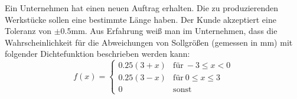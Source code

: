 \documentclass{abgabe}
\begin{document}
\begin{questions}
    \question
    Ein Unternehmen hat einen neuen Auftrag erhalten.
    Die zu produzierenden Werkstücke sollen eine bestimmte Länge haben.
    Der Kunde akzeptiert eine Toleranz von $\pm 0.5\si{\mm}$.
    Aus Erfahrung weiß man im Unternehmen, dass die Wahrscheinlichkeit für die Abweichungen von Sollgrößen (gemessen in \si{\mm}) mit folgender Dichtefunktion beschrieben werden kann:
    \[
        f(x) =
        \begin{cases}
            0.25(3+x) & \text{für} \ -3 \leq x < 0   \\
            0.25(3-x) & \text{für} \ 0 \leq x \leq 3 \\
            0         & \text{sonst}
        \end{cases}
    \]
\end{questions}
\end{document}
